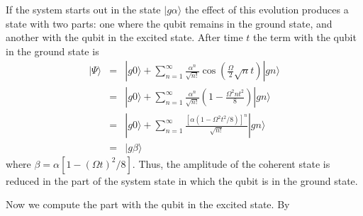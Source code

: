 \documentclass[twocolumn]{article}
\newcommand{\ket}[1]{|#1\rangle}
\begin{document}
If the system starts out in the state $\ket{g \alpha}$ the effect of this evolution produces a state with two parts: one where the qubit remains in the ground state, and another with the qubit in the excited state. After time $t$ the term with the qubit in the ground state is \begin{eqnarray*}
\ket{\Psi} &=& \ket{g0} + \sum_{n=1}^{\infty} \frac{\alpha^n}{\sqrt{n!}} \cos \left( \frac{\Omega}{2}\sqrt{n} t \right) \ket{gn} \\
&=& \ket{g0} + \sum_{n=1}^{\infty} \frac{\alpha^n}{\sqrt{n!}} \left( 1 - \frac{\Omega^2 n t^2}{8}\right) \ket{gn} \\
&=& \ket{g0} + \sum_{n=1}^{\infty} \frac{\left[ \alpha \left(1 - \Omega^2 t^2 / 8 \right) \right]^n}{\sqrt{n!}} \ket{gn} \\
&=& \ket{g \beta} \end{eqnarray*}
where $\beta = \alpha [1 - (\Omega t)^2 /8]$. Thus, the amplitude of the coherent state is reduced in the part of the system state in which the qubit is in the ground state.

Now we compute the part with the qubit in the excited state. By 
\end{document}
